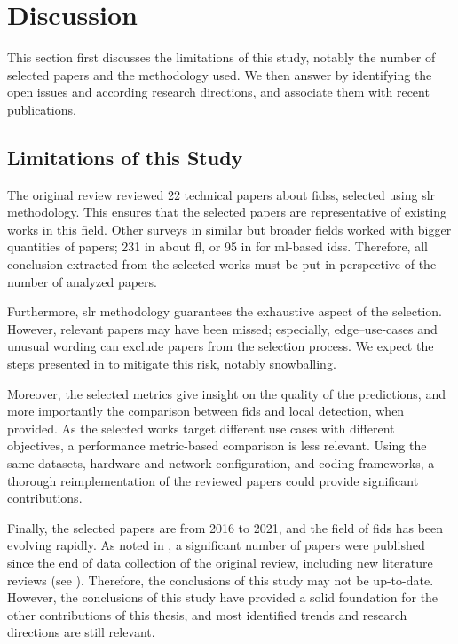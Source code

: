 \section{Discussion\label{sec:sota.discuss}}

This section first discusses the limitations of this study, notably the number of selected papers and the methodology used.
We then answer  by identifying the open issues and according research directions, and associate them with recent publications.


\subsection{Limitations of this Study\label{sec:sota.discuss.limits}}

The original review reviewed 22 technical papers about \glspl{fids}, selected using \gls{slr} methodology.
This ensures that the selected papers are representative of existing works in this field.
Other surveys in similar but broader fields worked with bigger quantities of papers; 231 in \cite{lo_SystematicLiteratureReview_2021} about \gls{fl}, or 95 in \cite{dacosta_InternetThingssurvey_2019} for \gls{ml}-based \glspl{ids}.
Therefore, all conclusion extracted from the selected works must be put in perspective of the number of analyzed papers.

Furthermore, \gls{slr} methodology guarantees the exhaustive aspect of the selection.
However, relevant papers may have been missed; especially, edge--use-cases and unusual wording can exclude papers from the selection process.
We expect the steps presented in  to mitigate this risk, notably snowballing.

Moreover, the selected metrics give insight on the quality of the predictions, and more importantly the comparison between \gls{fids} and local detection, when provided.
As the selected works target different use cases with different objectives, a performance metric-based comparison is less relevant.
Using the same datasets, hardware and network configuration, and coding frameworks, a thorough reimplementation of the reviewed papers could provide significant contributions.

Finally, the selected papers are from 2016 to 2021, and the field of \gls{fids} has been evolving rapidly.
As noted in , a significant number of papers were published since the end of data collection of the original review, including new literature reviews (see ).
Therefore, the conclusions of this study may not be up-to-date.
However, the conclusions of this study have provided a solid foundation for the other contributions of this thesis, and most identified trends and research directions are still relevant.


